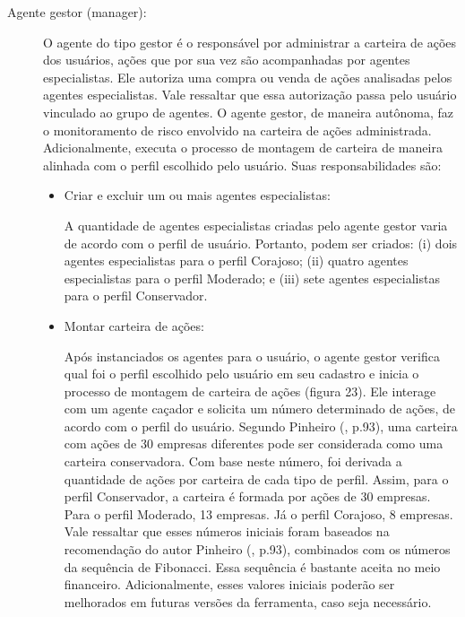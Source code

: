 \begin{description}
\item[Agente gestor (manager):]
O agente do tipo gestor é o responsável por administrar a carteira de ações dos usuários, ações que por sua vez são acompanhadas por agentes especialistas. Ele autoriza uma compra ou venda de ações analisadas pelos agentes especialistas. Vale ressaltar que essa autorização passa pelo usuário vinculado ao grupo de agentes. O agente gestor, de maneira autônoma, faz o monitoramento de risco envolvido na carteira de ações administrada. Adicionalmente, executa o processo de montagem de carteira de maneira alinhada com o perfil escolhido pelo usuário. Suas responsabilidades são:

\begin{itemize}
\item Criar e excluir um ou mais agentes especialistas:\newline

A quantidade de agentes especialistas criadas pelo agente gestor varia  de acordo com o perfil de usuário. Portanto, podem ser criados: (i) dois agentes especialistas para o perfil Corajoso; (ii) quatro agentes especialistas para o perfil Moderado; e (iii) sete agentes especialistas para o perfil Conservador.

\item Montar carteira de ações:\newline

Após instanciados os agentes para o usuário, o agente gestor verifica qual foi o perfil escolhido pelo usuário em seu cadastro e inicia o processo de montagem de carteira de ações (figura 23). Ele interage com um agente caçador e solicita um número determinado de ações, de acordo com o perfil do usuário. Segundo Pinheiro (\citeyear{pinheiro2008}, p.93), uma carteira com ações de 30 empresas diferentes pode ser considerada como uma carteira conservadora. Com base neste número, foi derivada a quantidade de ações por carteira de cada tipo de perfil. Assim, para o perfil Conservador, a carteira é formada por ações de 30 empresas. Para o perfil Moderado, 13 empresas. Já o perfil Corajoso, 8 empresas. Vale ressaltar que esses números iniciais foram baseados na recomendação do autor Pinheiro (\citeyear{pinheiro2008}, p.93), combinados com os números da sequência de Fibonacci. Essa sequência é bastante aceita no meio financeiro. Adicionalmente, esses valores iniciais poderão ser melhorados em futuras versões da ferramenta, caso seja necessário.


\end{itemize}
\end{description}
